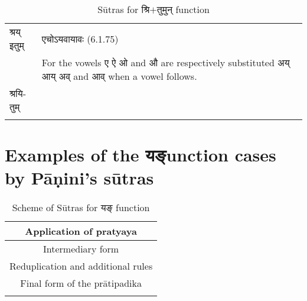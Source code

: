 \begin{longtable}{ |p{1.6cm}|p{14.4cm}| }
			\rowcolor{yellow!10}
			\texthindi{श्रय् इतुम्}&
			\texthindi{एचोऽयवायावः} (6.1.75)\\
			\rowcolor{yellow!10}
			&For the vowels \texthindi{ए ऐ ओ} and \texthindi{औ} are respectively substituted \texthindi{अय् आय् अव्} and \texthindi{आव्} when a vowel follows.
			\\\hline
			
			\rowcolor{yellow!10}
			\texthindi{श्रयितुम्}&	\\\hline 
		
		\caption{Sūtras for \texthindi{श्रि$+$तुमुन्} function}
		\label{table:a10}
		\end{longtable}



\section{Examples of the \texorpdfstring{\texthindi{यङ्}} function cases by Pāṇini’s sūtras}





		\begin{longtable}{ |c| } 
			\hline
			\rowcolor{red!10}
			Application of pratyaya
			\\\hline
			\rowcolor{blue!10}
			Intermediary form
			\\\hline
			\rowcolor{green!10}
			Reduplication and additional rules
			\\\hline
			\rowcolor{yellow!10}
			Final form of the  prātipadika 
			\\\hline
		
		\caption{Scheme of Sūtras for \texthindi{यङ्} function}
		\label{table:a11}
		\end{longtable}


